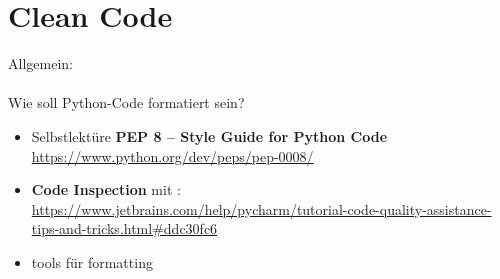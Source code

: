 \section{Clean Code}
Allgemein:
~\\~\\
Wie soll Python-Code formatiert sein?
	\begin{itemize}
		\item Selbstlektüre \textbf{PEP 8 -- Style Guide for Python Code}\\
		\url{https://www.python.org/dev/peps/pep-0008/}
		\item \textbf{Code Inspection} mit \pycharm:\\ \url{https://www.jetbrains.com/help/pycharm/tutorial-code-quality-assistance-tips-and-tricks.html\#ddc30fc6}
		\item tools für formatting
	\end{itemize}
